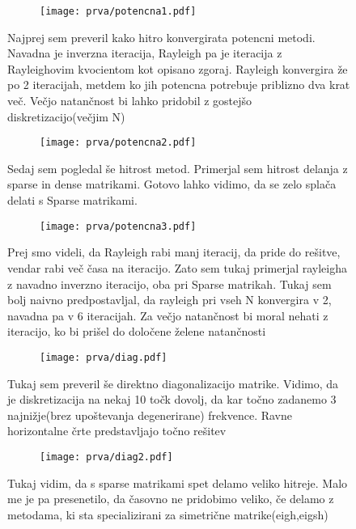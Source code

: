 \documentclass{article}
\begin{document}
\begin{figure}[H]
\centering
\begin{subfigure}{.7\textwidth}
\texttt{[image: prva/potencna1.pdf]}
\end{subfigure}
\caption*{Najprej sem preveril kako hitro konvergirata potencni metodi. Navadna je inverzna iteracija, Rayleigh pa je iteracija z Rayleighovim kvocientom kot opisano zgoraj. Rayleigh konvergira že po 2 iteracijah, metdem ko jih potencna potrebuje priblizno dva krat več. Večjo natančnost bi lahko pridobil z gostejšo diskretizacijo(večjim N)}
\end{figure}

\begin{figure}[H]
\centering
\begin{subfigure}{.7\textwidth}
\texttt{[image: prva/potencna2.pdf]}
\end{subfigure}
\caption*{Sedaj sem pogledal še hitrost metod. Primerjal sem hitrost delanja z sparse in dense matrikami. Gotovo lahko vidimo, da se zelo splača delati s Sparse matrikami.}
\end{figure}

\begin{figure}[H]
\centering
\begin{subfigure}{.7\textwidth}
\texttt{[image: prva/potencna3.pdf]}
\end{subfigure}
\caption*{Prej smo videli, da Rayleigh rabi manj iteracij, da pride do rešitve, vendar rabi več časa na iteracijo. Zato sem tukaj primerjal rayleigha z navadno inverzno iteracijo, oba pri Sparse matrikah. Tukaj sem bolj naivno predpostavljal, da rayleigh pri vseh N konvergira v 2, navadna pa v 6 iteracijah. Za večjo natančnost bi moral nehati z iteracijo, ko bi prišel do določene želene natančnosti}
\end{figure}

\begin{figure}[H]
\centering
\begin{subfigure}{.7\textwidth}
\texttt{[image: prva/diag.pdf]}
\end{subfigure}
\caption*{Tukaj sem preveril še direktno diagonalizacijo matrike. Vidimo, da je diskretizacija na nekaj 10 točk dovolj, da kar točno zadanemo 3 najnižje(brez upoštevanja degenerirane) frekvence. Ravne horizontalne črte predstavljajo točno rešitev}
\end{figure}

\begin{figure}[H]
\centering
\begin{subfigure}{.7\textwidth}
\texttt{[image: prva/diag2.pdf]}
\end{subfigure}
\caption*{Tukaj vidim, da s sparse matrikami spet delamo veliko hitreje. Malo me je pa presenetilo, da časovno ne pridobimo veliko, če delamo z metodama, ki sta specializirani za simetrične matrike(eigh,eigsh)}
\end{figure}
\end{document}
